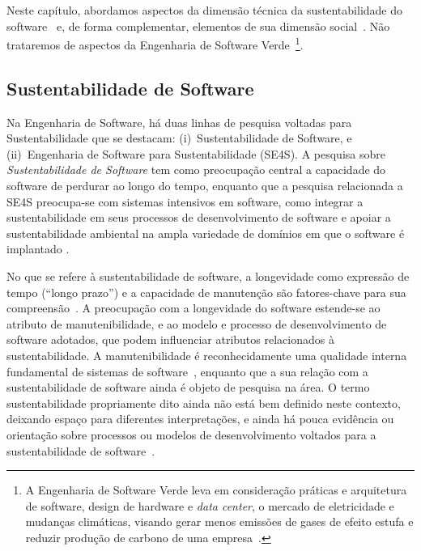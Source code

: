 Neste capítulo, abordamos aspectos da dimensão técnica da sustentabilidade do
software~\cite{DBLP:conf/re/KehrerP18} e, de forma complementar, elementos de sua dimensão social~\cite{DBLP:journals/sigsoft/Souza23}. 
Não trataremos de aspectos da Engenharia de Software Verde~\cite{ivan:green:2018}\footnote{A Engenharia de Software Verde leva em consideração práticas e arquitetura de software, design de hardware e \textit{data center}, o mercado de eletricidade e mudanças climáticas, visando gerar menos emissões de gases de efeito estufa e reduzir produção de carbono de uma empresa~\cite{ivan:green:2018}.}.

\subsection*{Sustentabilidade de Software}
\label{subsection:sustainability}

Na Engenharia de Software, há duas linhas de pesquisa voltadas para Sustentabilidade que se destacam: 
(i)~Sustentabilidade de Software, e 
(ii)~Engenharia de Software para Sustentabilidade (SE4S). 
%
A pesquisa sobre \textit{Sustentabilidade de Software} tem como preocupação central a capacidade do software de perdurar ao longo do tempo,
enquanto que a pesquisa relacionada a SE4S preocupa-se com
sistemas intensivos em software, como integrar a sustentabilidade em seus processos de desenvolvimento de software
e apoiar a sustentabilidade ambiental
na ampla variedade de domínios em que o software é implantado \cite{venters_software_2021}.
%

No que se refere à sustentabilidade de software,
a longevidade como expressão de tempo (``longo prazo'') e a capacidade de manutenção são fatores-chave para sua compreensão~\cite{venters_2018}.
%
A preocupação com a longevidade do software estende-se ao atributo de manutenibilidade, e ao modelo e processo de desenvolvimento de software adotados, que podem influenciar atributos relacionados à sustentabilidade.
A manutenibilidade é reconhecidamente uma qualidade interna fundamental de sistemas de software~\cite{iec2014iso}, 
enquanto que a sua relação com a sustentabilidade de software ainda é objeto de pesquisa na área.
%
O termo sustentabilidade propriamente dito ainda não está bem definido neste contexto, deixando espaço para diferentes interpretações, e ainda há pouca evidência ou orientação sobre processos ou modelos de desenvolvimento voltados para a sustentabilidade de software~\cite{venters_software_2021}.

